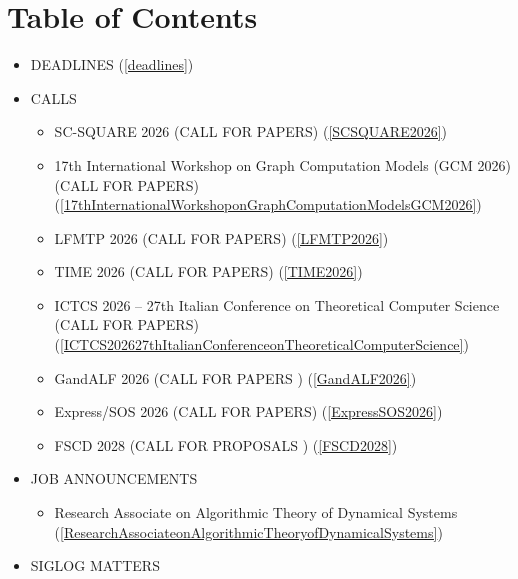 \documentclass[prodmode,acmtecs]{acmsmall} %
\begin{document}
\section{Table of Contents}\begin{itemize}\item DEADLINES (\cref{deadlines}) 
 
\item CALLS 
 
\begin{itemize}\item SC-SQUARE 2026 (CALL FOR PAPERS) (\cref{SCSQUARE2026})
\item 17th International Workshop on Graph Computation Models  (GCM 2026) (CALL FOR PAPERS) (\cref{17thInternationalWorkshoponGraphComputationModelsGCM2026})
\item LFMTP 2026 (CALL FOR PAPERS) (\cref{LFMTP2026})
\item TIME 2026 (CALL FOR PAPERS) (\cref{TIME2026})
\item ICTCS 2026 – 27th Italian Conference on Theoretical Computer Science (CALL FOR PAPERS) (\cref{ICTCS202627thItalianConferenceonTheoreticalComputerScience})
\item GandALF 2026 (CALL FOR PAPERS ) (\cref{GandALF2026})
\item Express/SOS 2026 (CALL FOR PAPERS) (\cref{ExpressSOS2026})
\item FSCD 2028 (CALL FOR PROPOSALS ) (\cref{FSCD2028})
\end{itemize} 
\item JOB ANNOUNCEMENTS 
 
\begin{itemize}\item Research Associate on Algorithmic Theory of Dynamical Systems (\cref{ResearchAssociateonAlgorithmicTheoryofDynamicalSystems})
\end{itemize} 
\item SIGLOG MATTERS 
 

\end{itemize}
\end{document}
